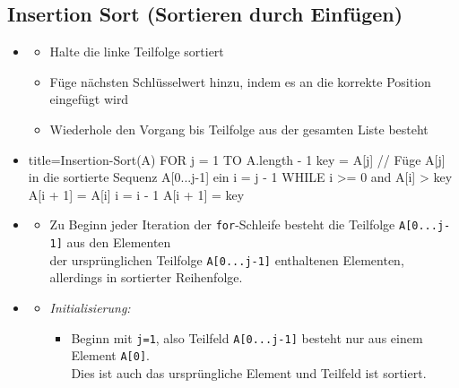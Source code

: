 \documentclass[
    ngerman,
    color=3b,
    load_common, %
    summary,
    boxarc,
]{tuda_summary}
\begin{document}
\subsection{Insertion Sort \textmd{(Sortieren durch Einfügen)}}\label{InsertionSort}
\begin{itemize}
    \item {}
          \begin{itemize}
              \item Halte die linke Teilfolge sortiert
              \item Füge nächsten Schlüsselwert hinzu, indem es an die korrekte Position eingefügt wird
              \item Wiederhole den Vorgang bis Teilfolge aus der gesamten Liste besteht
          \end{itemize}

    \item {}
          \begin{itemize}
              \begin{codeBlock}[autogobble]{title=Insertion-Sort(A)}
                  FOR j = 1 TO A.length - 1
                    key = A[j]
                    // Füge A[j] in die sortierte Sequenz A[0...j-1] ein
                    i = j - 1
                    WHILE i >= 0 and A[i] > key
                        A[i + 1] = A[i]
                        i = i - 1
                    A[i + 1] = key
              \end{codeBlock}
          \end{itemize}

    \item {}\label{insSortSiv}
          \begin{itemize}
              \item Zu Beginn jeder Iteration der \texttt{for}-Schleife besteht die Teilfolge \texttt{A[0...j-1]} aus den Elementen \\
                    der ursprünglichen Teilfolge \texttt{A[0...j-1]} enthaltenen Elementen, allerdings in sortierter Reihenfolge.
          \end{itemize}

    \item {}
          \begin{itemize}
              \item \textit{Initialisierung:}
                    \begin{itemize}
                        \item   Beginn mit \texttt{j=1}, also Teilfeld \texttt{A[0...j-1]} besteht nur aus einem Element \texttt{A[0]}. \\
                              Dies ist auch das ursprüngliche Element und Teilfeld ist sortiert.
                    \end{itemize}


\end{itemize}
\end{itemize}
\end{document}
